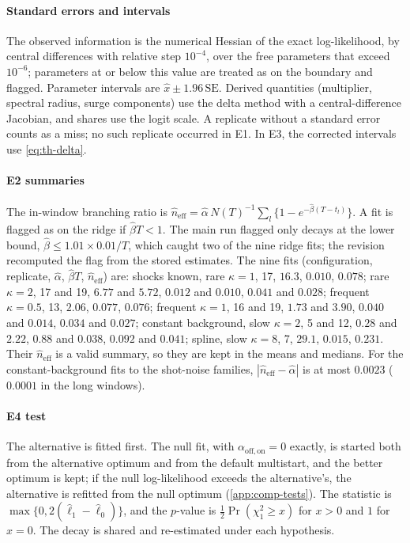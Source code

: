 \paragraph{Standard errors and intervals} The observed information is the numerical Hessian
of the exact log-likelihood, by central differences with relative step $10^{-4}$, over the
free parameters that exceed $10^{-6}$; parameters at or below this value are treated as
on the boundary and flagged. Parameter intervals are
$\hat x\pm1.96\,\mathrm{SE}$. Derived quantities (multiplier, spectral radius, surge
components) use the delta method with a central-difference Jacobian, and shares use the
logit scale. A replicate without a standard error counts as a miss; no such replicate
occurred in E1. In E3, the corrected intervals use \eqref{eq:th-delta}.

\paragraph{E2 summaries} The in-window branching ratio is
$\hat n_{\mathrm{eff}}=\hat\alpha\,N(T)^{-1}\sum_l\{1-e^{-\hat\beta(T-t_l)}\}$. A fit is
flagged as on the ridge if $\hat\beta T<1$. The main run flagged only decays at the lower
bound, $\hat\beta\le1.01\times0.01/T$, which caught two of the nine ridge fits; the
revision recomputed the flag from the stored estimates. The nine fits (configuration,
replicate, $\hat\alpha$, $\hat\beta T$, $\hat n_{\mathrm{eff}}$) are: shocks known, rare
$\kappa=1$, 17, $16.3$, $0.010$, $0.078$; rare $\kappa=2$, 17 and 19, $6.77$ and $5.72$,
$0.012$ and $0.010$, $0.041$ and $0.028$; frequent $\kappa=0.5$, 13, $2.06$, $0.077$,
$0.076$; frequent $\kappa=1$, 16 and 19, $1.73$ and $3.90$, $0.040$ and $0.014$, $0.034$
and $0.027$; constant background, slow $\kappa=2$, 5 and 12, $0.28$ and $2.22$, $0.88$ and
$0.038$, $0.092$ and $0.041$; spline, slow $\kappa=8$, 7, $29.1$, $0.015$, $0.231$. Their
$\hat n_{\mathrm{eff}}$ is a valid summary, so they are kept in the means and medians. For
the constant-background fits to the shot-noise families, $|\hat n_{\mathrm{eff}}-\hat\alpha|$
is at most $0.0023$ ($0.0001$ in the long windows).

\paragraph{E4 test} The alternative is fitted first. The null fit, with
$\alpha_{\mathrm{off},\mathrm{on}}=0$ exactly, is started both from the alternative optimum
and from the default multistart, and the better optimum is kept; if the null
log-likelihood exceeds the alternative's, the alternative is refitted from the null optimum
(\cref{app:comp-tests}). The statistic is $\max\{0,2(\hat\ell_1-\hat\ell_0)\}$, and the
$p$-value is $\tfrac12\Pr(\chi^2_1\ge x)$ for $x>0$ and $1$ for $x=0$. The decay is shared
and re-estimated under each hypothesis.

